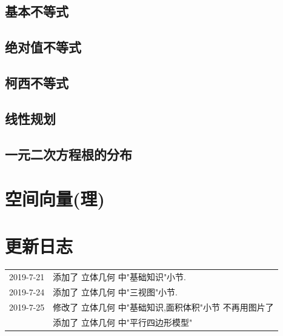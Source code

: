 \documentclass[hyperref, UTF8,11pt,a4paper]{ctexart} %
\begin{document}
\subsection{基本不等式}
\subsection{绝对值不等式}
\subsection{柯西不等式}
\subsection{线性规划}
\subsection{一元二次方程根的分布}


\section{空间向量(理)}
\newpage
\section{更新日志}

\begin{flushleft}

	{\renewcommand\baselinestretch{2}\selectfont %
		\begin{tabular}{p{80 pt} p{500 pt} }
			2019-7-21 & 添加了 立体几何 中"基础知识"小节.                      \\
			2019-7-24 & 添加了 立体几何 中"三视图"小节.                        \\
			2019-7-25 & 修改了 立体几何 中"基础知识,面积体积"小节 不再用图片了 \\
			          & 添加了 立体几何 中"平行四边形模型"   \\
		\end{tabular} \\
		\par}
\end{flushleft}
\end{document}
